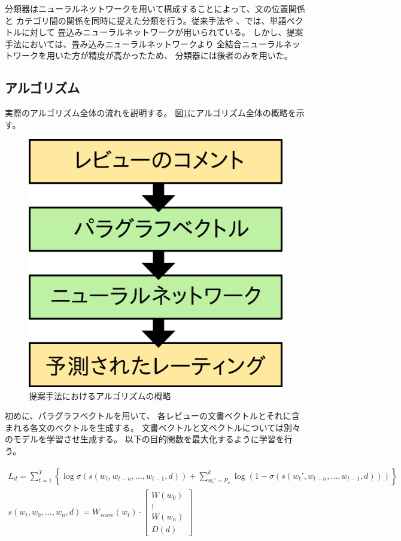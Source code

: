 \documentclass[twocolumn,a4paper]{ltjarticle}
\makeatletter
\let\tti@includegraphics\includegraphics
\renewcommand{\includegraphics}[1]{%
    \tti@includegraphics[width=\linewidth]{#1}}
\makeatother
\begin{document}
分類器はニューラルネットワークを用いて構成することによって、文の位置関係と
カテゴリ間の関係を同時に捉えた分類を行う。従来手法\cite{nal14}や
\cite{rie14}、\cite{duyu15}では、単語ベクトルに対して
畳込みニューラルネットワークが用いられている。
しかし、提案手法においては、畳み込みニューラルネットワークより
全結合ニューラルネットワークを用いた方が精度が高かったため、
分類器には後者のみを用いた。


\subsection{アルゴリズム}

実際のアルゴリズム全体の流れを説明する。
図\ref{fig:MyAlgorithm}にアルゴリズム全体の概略を示す。

\begin{figure}
  \includegraphics{fig/algorithm.eps}
  \caption{提案手法におけるアルゴリズムの概略}
  \label{fig:MyAlgorithm}
\end{figure}

初めに、パラグラフベクトルを用いて、
各レビューの文書ベクトルとそれに含まれる各文のベクトルを生成する。
文書ベクトルと文ベクトルについては別々のモデルを学習させ生成する。
以下の目的関数を最大化するように学習を行う。

\begin{gather}
  L_d = \sum^{T}_{t = 1} \left\{ \log \sigma(s(w_t, w_{t-n}, ..., w_{t-1}, d))
        + \sum^{k}_{w_{t}' \sim P_n}
          \log(1 - \sigma(s(w_{t}', w_{t-n}, ..., w_{t-1}, d))) \right\}
  \label{eq:ObjectiveFunction} \\
  s(w_t, w_0, ..., w_n, d)
    = W_{score}(w_t)
      \cdot \begin{bmatrix} W(w_0) \\ \vdots \\ W(w_n) \\ D(d) \end{bmatrix}
\end{gather}
\end{document}
